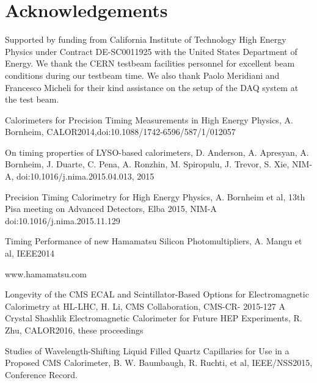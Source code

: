 \documentclass[preprint,1p]{elsarticle}
\begin{document}
  
%
%
  
%
%
  
%
%

\section{Acknowledgements} 
Supported by funding from California Institute of Technology High Energy Physics
under Contract DE-SC0011925 with the United States Department of Energy. We
thank the CERN testbeam facilities personnel for excellent beam conditions 
during our testbeam time. We also thank Paolo Meridiani and Francesco Micheli
for their kind assistance on the setup of the DAQ system at the test beam.
%
%


{}
 

\begin{thebibliography}{00}
 Calorimeters for Precision Timing Measurements in High Energy Physics, A. Bornheim, CALOR2014,doi:10.1088/1742-6596/587/1/012057

 On timing properties of LYSO-based calorimeters, D. Anderson, A. Apresyan, A. Bornheim, J. Duarte, C. Pena, A. Ronzhin, M. Spiropulu, J. Trevor, S. Xie, NIM-A, doi:10.1016/j.nima.2015.04.013, 2015

 Precision Timing Calorimetry for High Energy Physics, A. Bornheim et al, 13th Pisa meeting on Advanced Detectors, Elba 2015, NIM-A doi:10.1016/j.nima.2015.11.129

Timing Performance of new Hamamatsu Silicon Photomultipliers, A. Mangu et al, IEEE2014

 www.hamamatsu.com



 Longevity of the CMS ECAL and Scintillator-Based Options for Electromagnetic Calorimetry at HL-LHC, H. Li, CMS Collaboration, CMS-CR-
2015-127 
 A Crystal Shashlik Electromagnetic Calorimeter for Future HEP Experiments, R. Zhu, CALOR2016, these proceedings

 Studies of Wavelength-Shifting Liquid Filled Quartz Capillaries for Use in a Proposed CMS Calorimeter, B. W. Baumbaugh, R. Ruchti, 
et al, IEEE/NSS2015, Conference Record.






\end{thebibliography}
\end{document}
